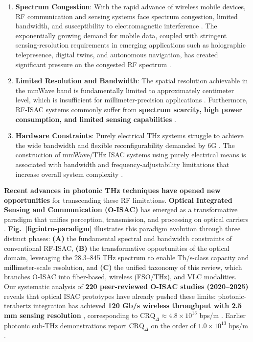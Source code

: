 \begin{enumerate}
\item \textbf{Spectrum Congestion}: With the rapid advance of wireless mobile devices, RF communication and sensing systems face spectrum congestion, limited bandwidth, and susceptibility to electromagnetic interference \cite{O_ISAC_068}. The exponentially growing demand for mobile data, coupled with stringent sensing-resolution requirements in emerging applications such as holographic telepresence, digital twins, and autonomous navigation, has created significant pressure on the congested RF spectrum \cite{O_ISAC_161}.
\item \textbf{Limited Resolution and Bandwidth}: The spatial resolution achievable in the mmWave band is fundamentally limited to approximately centimeter level, which is insufficient for millimeter-precision applications \cite{O_ISAC_021}. Furthermore, RF-ISAC systems commonly suffer from \textbf{spectrum scarcity, high power consumption, and limited sensing capabilities} \cite{O_ISAC_203}.
\item \textbf{Hardware Constraints}: Purely electrical THz systems struggle to achieve the wide bandwidth and flexible reconfigurability demanded by 6G \cite{O_ISAC_070}. The construction of mmWave/THz ISAC systems using purely electrical means is associated with bandwidth and frequency-adjustability limitations that increase overall system complexity \cite{O_ISAC_286}.
\end{enumerate}

\textbf{Recent advances in photonic THz techniques have opened new opportunities} for transcending these RF limitations. \textbf{Optical Integrated Sensing and Communication (O-ISAC)} has emerged as a transformative paradigm that unifies perception, transmission, and processing on optical carriers \cite{O_ISAC_021}. \textbf{Fig.~\ref{fig:intro-paradigm}} illustrates this paradigm evolution through three distinct phases: \textbf{(A)} the fundamental spectral and bandwidth constraints of conventional RF-ISAC, \textbf{(B)} the transformative opportunities of the optical domain, leveraging the 28.3--845 THz spectrum to enable Tb/s-class capacity and millimeter-scale resolution, and \textbf{(C)} the unified taxonomy of this review, which branches O-ISAC into fiber-based, wireless (FSO/THz), and VLC modalities. Our systematic analysis of \textbf{220 peer-reviewed O-ISAC studies (2020--2025)} reveals that optical ISAC prototypes have already pushed these limits: photonic-terahertz integration has achieved \textbf{120 Gb/s wireless throughput with 2.5 mm sensing resolution} \cite{O_ISAC_105}, corresponding to $\mathrm{CRQ}_{\Delta} \approx 4.8\times10^{13}$ bps/m \cite{O_ISAC_105}. Earlier photonic sub-THz demonstrations report $\mathrm{CRQ}_{\Delta}$ on the order of $1.0\times10^{13}$ bps/m \cite{O_ISAC_016}.

